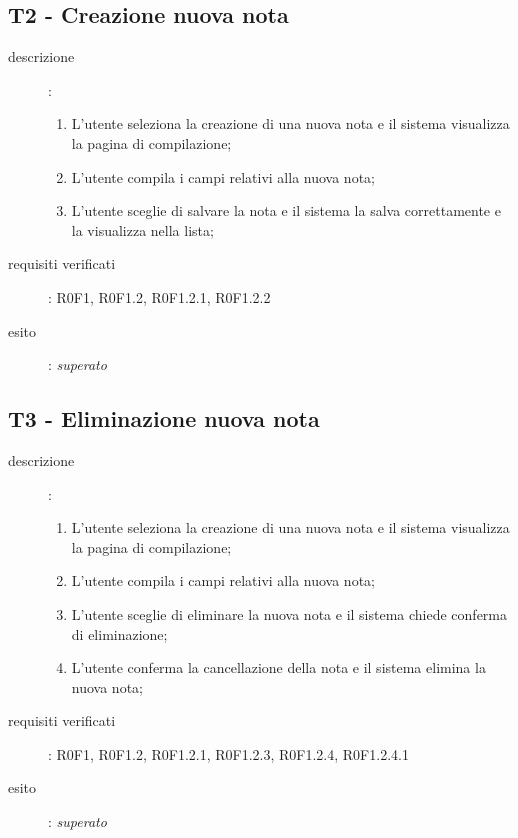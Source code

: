 \subsection{T2 - Creazione nuova nota}
\begin{description}
\item[descrizione]: \hfill
	\begin{enumerate}
	\item L'utente seleziona la creazione di una nuova nota e il sistema visualizza la pagina di compilazione;
	\item L'utente compila i campi relativi alla nuova nota;
	\item L'utente sceglie di salvare la nota e il sistema la salva correttamente e la visualizza nella lista;
	\end{enumerate}
\item[requisiti verificati]: R0F1, R0F1.2, R0F1.2.1, R0F1.2.2
\item[esito]: \emph{superato}
\end{description}

\subsection{T3 - Eliminazione nuova nota}
\begin{description}
\item[descrizione]: \hfill
	\begin{enumerate}
	\item L'utente seleziona la creazione di una nuova nota e il sistema visualizza la pagina di compilazione;
	\item L'utente compila i campi relativi alla nuova nota;
	\item L'utente sceglie di eliminare la nuova nota e il sistema chiede conferma di eliminazione;
	\item L'utente conferma la cancellazione della nota e il sistema elimina la nuova nota;
	\end{enumerate}
\item[requisiti verificati]: R0F1, R0F1.2, R0F1.2.1, R0F1.2.3, R0F1.2.4, R0F1.2.4.1
\item[esito]: \emph{superato}
\end{description}


